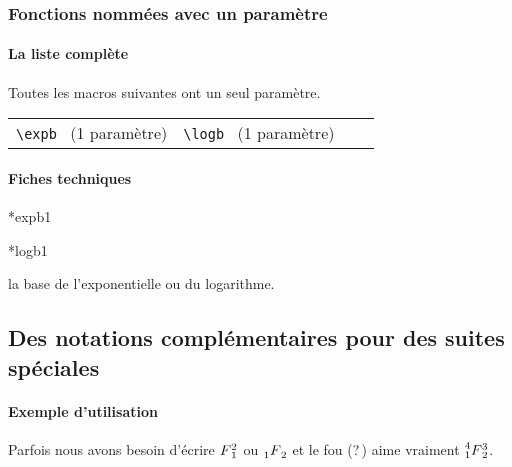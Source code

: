 \documentclass[12pt,a4paper]{article}
\makeatletter
\theoremstyle{definition}
\newcommand\IDmacro{\@ifstar{\@IDmacro@star}{\@IDmacro@no@star}}
\newcommand\@IDmacro@no@star[3]{%
    \texttt{%
    	\textbackslash#1%
    	\IfStrEq{#2}{0}{}{%
    		\,\,[#2 Option%
				\IfStrEq{#2}{1}{}{s}]%
			}%
	    \IfStrEq{#3}{}{}{%
	    		\,\,(#3 Argument%
				\IfStrEq{#3}{1}{}{s})%
			}
	   	}
    \immediate\write\tempfile{macro,#1,#2,#3}%
}
\newcommand\@IDmacro@star[2]{%
    \@IDmacro@no@star{#1}{0}{#2}%
}
\newcommand\@IDoptarg{\@ifstar{\@IDoptarg@star}{\@IDoptarg@no@star}}
\newcommand\@IDoptarg@star[2]{%
	\vspace{0.5em}
	\textbf{---} \texttt{#1%
		\IfStrEq{#2}{}{:}{\,#2:}%
	}%
}
\newcommand\@IDoptarg@no@star[2]{%
	\IfStrEq{#2}{}{%
		\@IDoptarg@star{#1}{}%
	}{%
		\@IDoptarg@star{#1}{#2}%
	}%
}
\newcommand\IDarg[1]{%
	\@IDoptarg{Argument}{#1}%
}
\makeatother
\begin{document}



        \subsubsection{Fonctions nommées avec un paramètre}

            \paragraph{La liste complète}

Toutes les macros suivantes ont un seul paramètre.

\medskip


\begin{tabular*}{\textwidth}{@{\extracolsep{\fill}}*{4}{l}}
    \verb+\expb+ \, (1 paramètre) & \verb+\logb+ \, (1 paramètre) &  & \\
\end{tabular*}




            \paragraph{Fiches techniques}

\IDmacro*{expb}{1}

\IDmacro*{logb}{1}

\IDarg{} la base de l'exponentielle ou du logarithme.





    \subsection{Des notations complémentaires pour des suites spéciales}

            \paragraph{Exemple d'utilisation}

\begin{tcblisting}{}
Parfois nous avons besoin d'écrire $\seqplus{F}{1}{2}$ ou $\hypergeo{F}{1}{2}$ et
le fou (?\,) aime vraiment $\suprageo{F}{1}{2}{3}{4}$.
\end{tcblisting}
\end{document}
